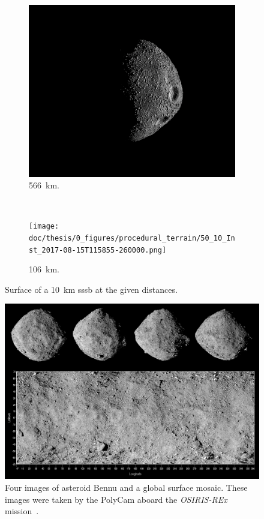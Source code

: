 \begin{figure}[htb]
    \centering
        \begin{subfigure}[b]{0.48\textwidth}
            \centering
                \includegraphics[width=\textwidth]{doc/thesis/0_figures/procedural_terrain/50_10_Inst_2017-08-15T115755-845000.png}
            \caption{\SI{566}{\kilo\meter}.}
            \label{fig:render_quali_comparison_1}
        \end{subfigure}
        \\
        \begin{subfigure}[b]{0.48\textwidth}
            \centering
                \texttt{[image: doc/thesis/0\_figures/procedural\_terrain/50\_10\_Inst\_2017-08-15T115855-260000.png]}
            \caption{\SI{106}{\kilo\meter}.}
            \label{fig:render_quali_comparison_2}
        \end{subfigure}
    \caption{Surface of a \SI{10}{\kilo\meter} \gls{sssb} at the given distances.}
    \label{fig:render_quali_comparison}
\end{figure}

\begin{figure}[htb]
    \centering
    \includegraphics[width=.7\textwidth]{doc/thesis/0_figures/procedural_terrain/2963_Bennu.png}
    \caption{Four images of asteroid Bennu and a global surface mosaic. These images were taken by the PolyCam aboard the \textit{OSIRIS-REx} mission~\cite{FourExploration}.}
    \label{fig:render_quali_bennu}
\end{figure}

